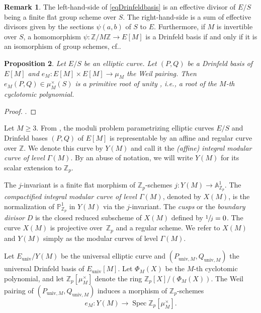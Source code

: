 \documentclass[11pt]{article}
\newcommand{\ie}{i.e.,\xspace}
\newcommand{\cf}{cf.\xspace}
\newcommand{\univ}{\mathrm{univ}}
\numberwithin{equation}{section}
\newtheorem{prop}{Proposition}[section]
\theoremstyle{definition}
\newtheorem{remark}[prop]{Remark}
\newcommand{\bb}[1]{\mathbb{#1}}
\DeclareMathOperator{\Spec}{Spec}
\begin{document}
\begin{remark}
The left-hand-side of \eqref{eqDrinfeldbasis} is an effective divisor of $E/S$ being a finite flat group scheme over $S$. The right-hand-side is a sum of effective divisors given by the sections $\psi(a,b)$ of $S$ to $E$. Furthermore, if $M$ is invertible over $S$, a homomorphism $\psi: \bb{Z}/M\bb{Z}\to E[M]$ is a Drinfeld basis if and only if it is an isomorphism of group schemes, \cf \cite[Lem.\,1.5.3]{katz1985arithmetic}.
\end{remark}

\begin{prop}
Let $E/S$ be an elliptic curve. Let $(P,Q)$ be a Drinfeld basis of $E[M]$ and $e_M: E[M]\times E[M]\to \mu_M$ the Weil pairing. Then $e_M(P,Q)\in \mu_M^\times(S)$ is a primitive root of unity , \ie a root of the $M$-th cyclotomic polynomial.
\end{prop}

\begin{proof}
\cite[Th.\,5.6.3]{katz1985arithmetic}.
\end{proof}

Let $M\geq 3$. From \cite[Th.\,5.1.1 \& Sch.\,4.7.0]{katz1985arithmetic}, the moduli problem parametrizing elliptic curves $E/S$ and Drinfeld bases $(P,Q)$ of $E[M]$ is representable by an affine and regular curve over $\bb{Z}$. We denote this curve by $Y(M)$ and call it the \textit{(affine) integral modular curve of level $\Gamma(M)$}. By an abuse of notation, we will write $Y(M)$ for its scalar extension to $\bb{Z}_p$.

The $j$-invariant is a finite flat morphism of $\bb{Z}_p$-schemes $j:Y(M)\to \bb{A}^1_{\bb{Z}_p}$. The \textit{compactified integral modular curve of level $\Gamma(M)$}, denoted by $X(M)$, is the normalization of $\bb{P}^1_{\bb{Z}_p}$ in $Y(M)$ via the $j$-invariant. The \textit{cusps} or the \textit{boundary divisor} $D$ is the closed reduced subscheme of $X(M)$ defined by $\sfrac{1}{j}=0$. The curve $X(M)$ is projective over~$\bb{Z}_p$ and a regular scheme.
We refer to $X(M)$ and $Y(M)$ simply as the modular curves of level $\Gamma(M)$.

Let $E_{\univ}/Y(M)$ be the universal elliptic curve and $(P_{\univ,M},Q_{\univ,M})$ the universal Drinfeld basis of $E_{\univ}[M]$. Let $\Phi_{M}(X)$ be the $M$-th cyclotomic polynomial, and let $\bb{Z}_p[\mu^{\times}_{M}]$ denote the ring $\bb{Z}_p[X]/(\Phi_{M}(X))$. The Weil pairing of $(P_{\univ,M},Q_{\univ,M})$ induces a morphism of $\bb{Z}_p$-schemes
\[
e_M:Y(M)\to \Spec \bb{Z}_p[\mu_{M}^{\times}].
\]
\end{document}

